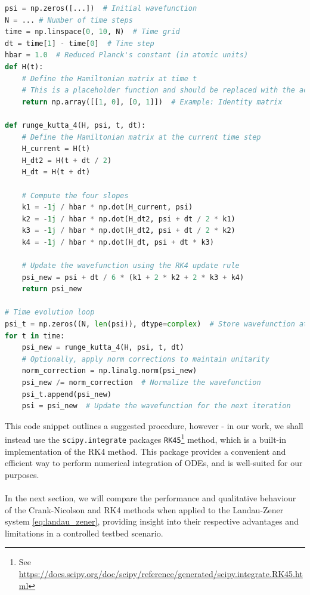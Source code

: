 \documentclass{subfiles}
\begin{document}
\begin{lstlisting}[language=Python]
psi = np.zeros([...])  # Initial wavefunction
N = ... # Number of time steps
time = np.linspace(0, 10, N)  # Time grid
dt = time[1] - time[0]  # Time step
hbar = 1.0  # Reduced Planck's constant (in atomic units)
def H(t):
    # Define the Hamiltonian matrix at time t
    # This is a placeholder function and should be replaced with the actual Hamiltonian
    return np.array([[1, 0], [0, 1]])  # Example: Identity matrix

def runge_kutta_4(H, psi, t, dt):
    # Define the Hamiltonian matrix at the current time step
    H_current = H(t)
    H_dt2 = H(t + dt / 2)
    H_dt = H(t + dt)
    
    # Compute the four slopes
    k1 = -1j / hbar * np.dot(H_current, psi)
    k2 = -1j / hbar * np.dot(H_dt2, psi + dt / 2 * k1)
    k3 = -1j / hbar * np.dot(H_dt2, psi + dt / 2 * k2)
    k4 = -1j / hbar * np.dot(H_dt, psi + dt * k3)

    # Update the wavefunction using the RK4 update rule
    psi_new = psi + dt / 6 * (k1 + 2 * k2 + 2 * k3 + k4)
    return psi_new

# Time evolution loop
psi_t = np.zeros((N, len(psi)), dtype=complex)  # Store wavefunction at each time step
for t in time:
    psi_new = runge_kutta_4(H, psi, t, dt)  
    # Optionally, apply norm corrections to maintain unitarity
    norm_correction = np.linalg.norm(psi_new)
    psi_new /= norm_correction  # Normalize the wavefunction
    psi_t.append(psi_new)
    psi = psi_new  # Update the wavefunction for the next iteration
\end{lstlisting}
This code snippet outlines a suggested procedure, however - in our work, we shall instead use the \texttt{scipy.integrate} packages \texttt{RK45}\footnote{See \url{https://docs.scipy.org/doc/scipy/reference/generated/scipy.integrate.RK45.html}} method, which is a built-in implementation of the RK4 method. This package provides a convenient and efficient way to perform numerical integration of ODEs, and is well-suited for our purposes.  \\\\
In the next section, we will compare the performance and qualitative behaviour of the Crank-Nicolson and RK4 methods when applied to the Landau-Zener system \eqref{eq:landau_zener}, providing insight into their respective advantages and limitations in a controlled testbed scenario.

\end{document}
